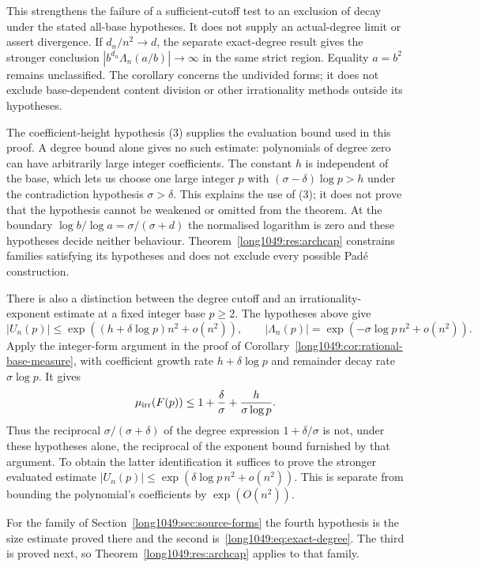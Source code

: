 \documentclass[11pt]{article}
\begin{document}
This strengthens the failure of a sufficient-cutoff test to an exclusion
of decay under the stated all-base hypotheses.  It does not supply an
actual-degree limit or assert divergence.  If $d_n/n^2\to d$, the separate
exact-degree result gives the stronger conclusion
$|b^{d_n}\Lambda_n(a/b)|\to\infty$ in the same strict region.
Equality $a=b^2$ remains unclassified.  The corollary concerns the undivided
forms; it does not exclude base-dependent content division or other
irrationality methods outside its hypotheses.


\noindent The coefficient-height hypothesis (3) supplies the evaluation bound
used in this proof. A degree bound alone gives no such estimate:
polynomials of degree zero can have arbitrarily large integer
coefficients. The constant $h$ is independent of the base, which lets
us choose one large integer $p$ with $(\sigma-\delta)\log p>h$
under the contradiction hypothesis $\sigma>\delta$.
This explains the use of (3); it does not prove that the hypothesis
cannot be weakened or omitted from the theorem.  At the boundary $\log b/\log a=\sigma/(\sigma+d)$ the normalised
logarithm is zero and these hypotheses decide neither behaviour.
Theorem~\ref{long1049:res:archcap} constrains families satisfying its hypotheses and
does not exclude every possible Pad\'e construction.

There is also a distinction between the degree cutoff and an
irrationality-exponent estimate at a fixed integer base $p\ge2$.
The hypotheses above give
\[
 |U_n(p)|\le\exp((h+\delta\log p)n^2+o(n^2)),\qquad
 |\Lambda_n(p)|=\exp(-\sigma\log p\,n^2+o(n^2)).
\]
Apply the integer-form argument in the proof of
Corollary~\ref{long1049:cor:rational-base-measure}, with coefficient
growth rate $h+\delta\log p$ and remainder decay rate $\sigma\log p$.
It gives
\[
 \mu_{\rm irr}(F(p))\le
 1+\frac{\delta}{\sigma}+\frac{h}{\sigma\log p}.
\]
Thus the reciprocal $\sigma/(\sigma+\delta)$ of the degree expression
$1+\delta/\sigma$ is not, under these hypotheses alone, the reciprocal
of the exponent bound furnished by that argument. To obtain the latter
identification it suffices to prove the stronger evaluated estimate
$|U_n(p)|\le\exp(\delta\log p\,n^2+o(n^2))$. This is separate from
bounding the polynomial's coefficients by $\exp(O(n^2))$.

For the family of Section~\ref{long1049:sec:source-forms} the fourth hypothesis is the
size estimate proved there and the second is~\eqref{long1049:eq:exact-degree}.  The third
is proved next, so Theorem~\ref{long1049:res:archcap} applies to that family.
\end{document}
